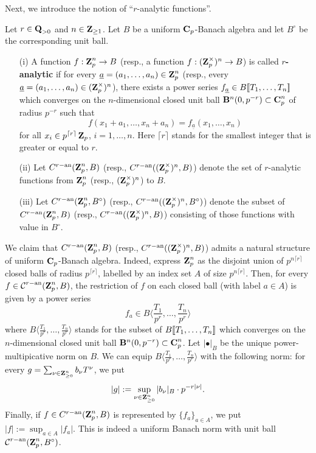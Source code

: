 Next, we introduce the notion of ``$r$-analytic functions''.

\begin{Definition}\label{Definition: w-analytic functions} Let $r\in \operatorname{\mathbf{Q}}_{>0}$ and $n\in \operatorname{\mathbf{Z}}_{\geq 1}$. Let $B$ be a uniform $\operatorname{\mathbf{C}}_p$-Banach algebra and let $B^{\circ}$ be the corresponding unit ball.
\begin{enumerate}
\item[(i)] A function $f: \operatorname{\mathbf{Z}}_p^n\rightarrow B$ (resp., a function $f:(\operatorname{\mathbf{Z}}_p^{\times})^n\rightarrow B$) is called \textbf{$r$-analytic} if for every $\underline{a}=(a_1, \ldots, a_n)\in \operatorname{\mathbf{Z}}_p^n$ (resp., every $\underline{a}=(a_1, \ldots, a_n)\in (\operatorname{\mathbf{Z}}_p^{\times})^n$), there exists a power series $f_{\underline{a}}\in B\operatorname{\![\![\!} T_1, \ldots, T_n\operatorname{\!]\!]}$ which converges on the $n$-dimensional closed unit ball $\mathbf{B}^n(0, p^{-r})\subset \operatorname{\mathbf{C}}_p^n$ of radius $p^{-r}$ such that 
$$f(x_1+a_1, \ldots, x_n+a_n)=f_{\underline{a}}(x_1, \ldots, x_n)$$
for all $x_i\in p^{\lceil r\rceil}\operatorname{\mathbf{Z}}_p$, $i=1,\ldots, n$. Here $\lceil r\rceil$ stands for the smallest integer that is greater or equal to $r$.
\item[(ii)] Let $C^{r-\operatorname{an}}(\operatorname{\mathbf{Z}}_p^n, B)$ (resp., $C^{r-\operatorname{an}}((\operatorname{\mathbf{Z}}_p^{\times})^n, B)$) denote the set of $r$-analytic functions from $\operatorname{\mathbf{Z}}_p^n$ (resp., $(\operatorname{\mathbf{Z}}_p^{\times})^n$) to $B$.
\item[(iii)] Let $C^{r-\operatorname{an}}(\operatorname{\mathbf{Z}}_p^n, B^{\circ})$ (resp., $C^{r-\operatorname{an}}((\operatorname{\mathbf{Z}}_p^{\times})^n, B^{\circ})$) denote the subset of $C^{r-\operatorname{an}}(\operatorname{\mathbf{Z}}_p^n, B)$ (resp., $C^{r-\operatorname{an}}((\operatorname{\mathbf{Z}}_p^{\times})^n, B)$) consisting of those functions with value in $B^{\circ}$.
\end{enumerate}
\end{Definition}

\begin{Remark}\label{Remark: uniform Banach algebra structure 2}
\normalfont We claim that $C^{r-\operatorname{an}}(\operatorname{\mathbf{Z}}_p^n, B)$ (resp., $C^{r-\operatorname{an}}((\operatorname{\mathbf{Z}}_p^{\times})^n, B)$) admits a natural structure of uniform $\operatorname{\mathbf{C}}_p$-Banach algebra. Indeed, express $\operatorname{\mathbf{Z}}_p^n$ as the disjoint union of $p^{n\lceil r\rceil}$ closed balls of radius $p^{\lceil r\rceil}$, labelled by an index set $A$ of size $p^{n\lceil r\rceil}$. Then, for every $f\in \operatorname{\mathcal{C}}^{r-\operatorname{an}}(\operatorname{\mathbf{Z}}_p^n, B)$, the restriction of $f$ on each closed ball (with label $a\in A$) is given by a power series $$f_a\in B\langle \frac{T_1}{p^r}, \ldots, \frac{T_n}{p^r}\rangle$$
where $B\langle \frac{T_1}{p^r}, \ldots, \frac{T_n}{p^r}\rangle$ stands for the subset of $B\operatorname{\![\![\!} T_1, \ldots, T_n\operatorname{\!]\!]}$ which converges on the $n$-dimensional closed unit ball $\mathbf{B}^n(0, p^{-r})\subset \operatorname{\mathbf{C}}_p^n$. Let $|\bullet|_B$ be the unique power-multipicative norm on $B$. We can equip $B\langle \frac{T_1}{p^r}, \ldots, \frac{T_n}{p^r}\rangle$ with the following norm: for every $g=\sum_{\nu\in \operatorname{\mathbf{Z}}_{\geq 0}^n} b_{\nu}T^{\nu}$, we put 
$$|g|:=\sup_{\nu\in \operatorname{\mathbf{Z}}_{\geq 0}^n}|b_{\nu}|_B\cdot p^{-r |\nu|}.$$
Finally, if $f\in C^{r-\operatorname{an}}(\operatorname{\mathbf{Z}}_p^n, B)$ is represented by $\{f_a\}_{a\in A}$, we put $|f|:=\sup_{a\in A} |f_a|$. This is indeed a uniform Banach norm with unit ball $\operatorname{\mathcal{C}}^{r-\operatorname{an}}(\operatorname{\mathbf{Z}}_p^n, B^{\circ})$.
\end{Remark}

